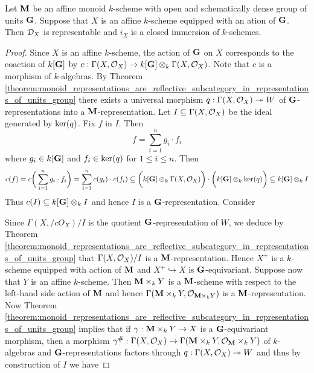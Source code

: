 \begin{theorem}\label{theorem:representability_of_bb_for_affine}
Let $\mathbf{M}$ be an affine monoid $k$-scheme with open and schematically dense group of units $\mathbf{G}$. Suppose that $X$ is an affine $k$-scheme equipped with an ation of $\mathbf{G}$. Then ${\mathcal D}_X$ is representable and $i_X$ is a closed immersion of $k$-schemes.
\end{theorem}
\begin{proof}
Since $X$ is an affine $k$-scheme, the action of $\mathbf{G}$ on $X$ corresponds to the coaction of $k[\mathbf{G}]$ by $c:\Gamma(X,{\mathcal O}_X)\rightarrow k[\mathbf{G}]\otimes_k\Gamma(X,{\mathcal O}_X)$. Note that $c$ is a morphism of $k$-algebras. By Theorem \ref{theorem:monoid_representations_are_reflective_subcategory_in_representations_of_units_group} there exists a universal morphism $q:\Gamma(X,{\mathcal O}_X)\twoheadrightarrow W$ of $\mathbf{G}$-representations into a $\mathbf{M}$-representation. Let $I\subseteq \Gamma(X,{\mathcal O}_X)$ be the ideal generated by $\mathrm{ker}(q)$. Fix $f$ in $I$. Then
$$f = \sum_{i=1}^ng_i\cdot f_i$$
where $g_i \in k[\mathbf{G}]$ and $f_i\in \mathrm{ker}(q)$ for $1\leq i\leq n$. Then
$$c(f) = c\bigg(\sum_{i=1}^n g_i\cdot f_i\bigg) = \sum_{i=1}^nc(g_i)\cdot c(f_i) \subseteq \bigg(k[\mathbf{G}]\otimes_k \Gamma(X,{\mathcal O}_X)\bigg) \cdot \bigg(k[\mathbf{G}]\otimes_k \mathrm{ker}(q) \bigg) \subseteq k[\mathbf{G}]\otimes_k I$$
Thus $c(I) \subseteq k[\mathbf{G}]\otimes_kI$ and hence $I$ is a $\mathbf{G}$-representation. Consider
\begin{center}
\end{center}
Since $\Gamma(X,/cO_X)/I$ is the quotient $\mathbf{G}$-representation of $W$, we deduce by Theorem \ref{theorem:monoid_representations_are_reflective_subcategory_in_representations_of_units_group} that $\Gamma(X,{\mathcal O}_X)/I$ is a $\mathbf{M}$-representation. Hence $X^+$ is a $k$-scheme equipped with action of $\mathbf{M}$ and $X^+\hookrightarrow X$ is $\mathbf{G}$-equivariant. Suppose now that $Y$ is an affine $k$-scheme. Then $\mathbf{M}\times_kY$ is a $\mathbf{M}$-scheme with respect to the left-hand side action of $\mathbf{M}$ and hence $\Gamma(\mathbf{M}\times_kY,{\mathcal O}_{\mathbf{M}\times_kY})$ is a $\mathbf{M}$-representation. Now Theorem \ref{theorem:monoid_representations_are_reflective_subcategory_in_representations_of_units_group} implies that if $\gamma:\mathbf{M}\times_kY\rightarrow X$ is a $\mathbf{G}$-equivariant morphism, then a morphism $\gamma^{\#}:\Gamma(X,{\mathcal O}_X)\rightarrow \Gamma(\mathbf{M}\times_kY,{\mathcal O}_{\mathbf{M}}\times_kY)$ of $k$-algebras and $\mathbf{G}$-representations factors through $q:\Gamma(X,{\mathcal O}_X)\twoheadrightarrow W$ and thus by construction of $I$ we have

\end{proof}
